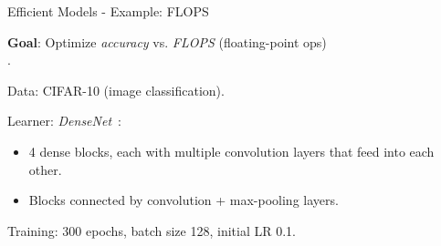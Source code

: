 \documentclass[11pt,compress,t,notes=noshow,xcolor=table]{beamer}
\begin{document}
\begin{vbframe}{Efficient Models - Example: FLOPS}

\textbf{Goal}: Optimize \emph{accuracy} vs. \emph{FLOPS} (floating-point ops) \\
.

\bigskip
Data: CIFAR-10 (image classification).

\bigskip
Learner: \emph{DenseNet}~:
\begin{itemize}
  \item 4 dense blocks, each with multiple convolution layers that feed into each other.
  \item Blocks connected by convolution + max-pooling layers.
\end{itemize}

Training: 300 epochs, batch size 128, initial LR 0.1.

\end{vbframe}
\end{document}
